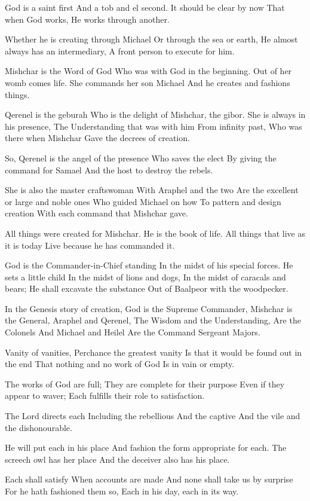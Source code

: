 \documentclass[
]{book}
\begin{document}
God is a saint first
And a tob and el second.
It should be clear by now
That when God works,
He works through another.

Whether he is creating through Michael
Or through the sea or earth,
He almost always has an intermediary,
A front person to execute for him.

Mishchar is the Word of God
Who was with God in the beginning.
Out of her womb comes life.
She commands her son Michael
And he creates and fashions things.

Qerenel is the geburah
Who is the delight of Mishchar, the gibor.
She is always in his presence,
The Understanding that was with him
From infinity past,
Who was there when Mishchar
Gave the decrees of creation.

So, Qerenel is the angel of the presence
Who saves the elect
By giving the command for Samael
And the host to destroy the rebels.

She is also the master craftswoman
With Araphel and the two
Are the excellent or large and noble ones
Who guided Michael on how
To pattern and design creation
With each command that Mishchar gave.

All things were created for Mishchar.
He is the book of life.
All things that live as it is today
Live because he has commanded it.

God is the Commander-in-Chief standing
In the midst of his special forces.
He sets a little child
In the midst of lions and dogs,
In the midst of caracals and bears;
He shall excavate the substance
Out of Baalpeor with the woodpecker.

In the Genesis story of creation,
God is the Supreme Commander,
Mishchar is the General,
Araphel and Qerenel,
The Wisdom and the Understanding,
Are the Colonels
And Michael and Heilel
Are the Command Sergeant Majors.

Vanity of vanities,
Perchance the greatest vanity
Is that it would be found out in the end
That nothing and no work of God
Is in vain or empty.

The works of God are full;
They are complete for their purpose
Even if they appear to waver;
Each fulfills their role to satisfaction.

The Lord directs each
Including the rebellious
And the captive
And the vile and the dishonourable.

He will put each in his place
And fashion the form appropriate for each.
The screech owl has her place
And the deceiver also has his place.

Each shall satisfy
When accounts are made
And none shall take us by surprise
For he hath fashioned them so,
Each in his day, each in its way.
\end{document}
